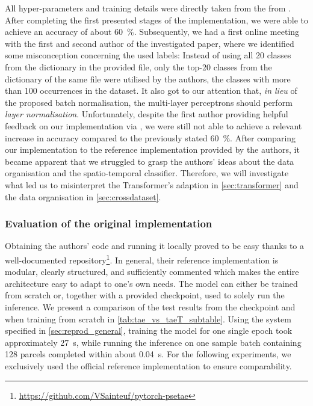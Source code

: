 All hyper-parameters and training details were directly taken from the  from \textcite{Garnot20:SIT}.
After completing the first presented stages of the implementation, we were able to achieve an accuracy of about \SI{60}{\percent}.
Subsequently, we had a first online meeting with the first and second author of the investigated paper, 
where we identified some misconception concerning the used labels:
Instead of using all 20 classes from the  dictionary in the provided  file, only the top-20 classes from the  dictionary of the same file were utilised by the authors, \ie the classes with more than 100 occurrences in the dataset.
It also got to our attention that, \textit{in lieu} of the proposed batch normalisation, the multi-layer perceptrons should perform \emph{layer normalisation}.
Unfortunately, despite the first author providing helpful feedback on our implementation via \GitHub, we were still not able to achieve a relevant increase in accuracy compared to the previously stated \SI{60}{\percent}.
After comparing our implementation to the reference implementation provided by the authors, it became apparent that we struggled to grasp the authors' ideas about the data organisation and the spatio-temporal classifier.
Therefore, we will investigate what led us to misinterpret the Transformer's adaption in \cref{sec:transformer} and the data organisation in \cref{sec:crossdataset}.

\subsubsection{Evaluation of the original implementation}  \label{sec:run_code}

\figArchitecture

Obtaining the authors' code and running it locally proved to be easy thanks to a well-documented \GitHub repository\footnote{\url{https://github.com/VSainteuf/pytorch-psetae}}.
In general, their reference implementation is modular, clearly structured, and sufficiently commented which makes the entire architecture easy to adapt to one's own needs.
The model can either be trained from scratch or, together with a provided checkpoint, used to solely run the inference.
We present a comparison of the test results from the checkpoint and when training from scratch in \cref{tab:tae_vs_taeT_subtable}.
Using the system specified in \cref{sec:reprod_general}, training the model for one single epoch took approximately \SI{27}{\second}, while running the inference on one sample batch containing 128 parcels completed within about \SI{0.04}{\second}.
For the following experiments, we exclusively used the official reference implementation to ensure comparability.

